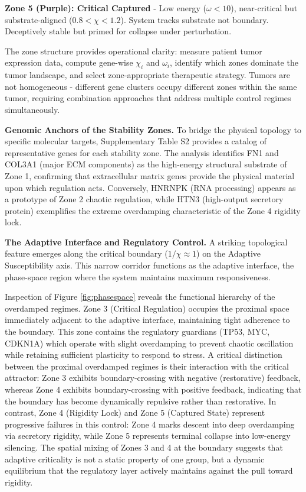 \documentclass[11pt,letterpaper]{article}
\begin{document}
\textbf{Zone 5 (Purple): Critical Captured} - Low energy ($\omega < 10$), near-critical but substrate-aligned ($0.8 < \chi < 1.2$). System tracks substrate not boundary. Deceptively stable but primed for collapse under perturbation.

The zone structure provides operational clarity: measure patient tumor expression data, compute gene-wise $\chi_i$ and $\omega_i$, identify which zones dominate the tumor landscape, and select zone-appropriate therapeutic strategy. Tumors are not homogeneous - different gene clusters occupy different zones within the same tumor, requiring combination approaches that address multiple control regimes simultaneously.

\textbf{Genomic Anchors of the Stability Zones.} To bridge the physical topology to specific molecular targets, Supplementary Table S2 provides a catalog of representative genes for each stability zone. The analysis identifies FN1 and COL3A1 (major ECM components) as the high-energy structural substrate of Zone 1, confirming that extracellular matrix genes provide the physical material upon which regulation acts. Conversely, HNRNPK (RNA processing) appears as a prototype of Zone 2 chaotic regulation, while HTN3 (high-output secretory protein) exemplifies the extreme overdamping characteristic of the Zone 4 rigidity lock.

\textbf{The Adaptive Interface and Regulatory Control.} A striking topological feature emerges along the critical boundary ($1/\chi \approx 1$) on the Adaptive Susceptibility axis. This narrow corridor functions as the adaptive interface, the phase-space region where the system maintains maximum responsiveness.

Inspection of Figure \ref{fig:phasespace} reveals the functional hierarchy of the overdamped regimes. Zone 3 (Critical Regulation) occupies the proximal space immediately adjacent to the adaptive interface, maintaining tight adherence to the boundary. This zone contains the regulatory guardians (TP53, MYC, CDKN1A) which operate with slight overdamping to prevent chaotic oscillation while retaining sufficient plasticity to respond to stress. A critical distinction between the proximal overdamped regimes is their interaction with the critical attractor: Zone 3 exhibits boundary-crossing with negative (restorative) feedback, whereas Zone 4 exhibits boundary-crossing with positive feedback, indicating that the boundary has become dynamically repulsive rather than restorative. In contrast, Zone 4 (Rigidity Lock) and Zone 5 (Captured State) represent progressive failures in this control: Zone 4 marks descent into deep overdamping via secretory rigidity, while Zone 5 represents terminal collapse into low-energy silencing. The spatial mixing of Zones 3 and 4 at the boundary suggests that adaptive criticality is not a static property of one group, but a dynamic equilibrium that the regulatory layer actively maintains against the pull toward rigidity.
\end{document}
